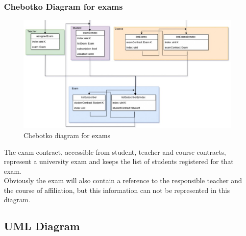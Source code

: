 \documentclass[ManualeSviluppatore]{subfiles}
\begin{document}
\subsubsection{Chebotko Diagram for exams}
\begin{figure}[H]
	\centering
	\includegraphics[width=1\linewidth]{"diagrammi/chebotko/exam"}
	\caption{Chebotko diagram for exams}
	\label{fig:Chebotko diagram for exams}
\end{figure}
The exam contract, accessible from student, teacher and course contracts, represent a university exam and keeps the list of students registered for that exam. \\
Obviously the exam will also contain a reference to the responsible teacher and the course of affiliation, but this information can not be represented in this diagram. \\

\subsection{UML Diagram}
\end{document}

